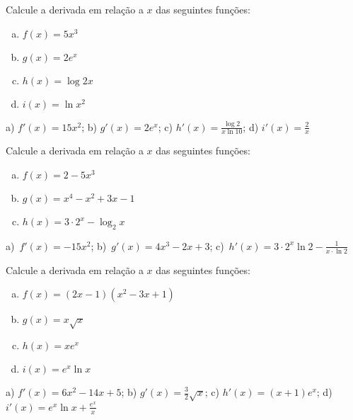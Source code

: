 \begin{exer}
  Calcule a derivada em relação a $x$ das seguintes funções:
  \begin{enumerate}[a)]
  \item $\displaystyle f(x) = 5x^3$
  \item $\displaystyle g(x) = 2e^x$
  \item $\displaystyle h(x) = \log 2x$
  \item $\displaystyle i(x) = \ln x^2$
  \end{enumerate}
\end{exer}
\begin{resp}
  a) $\displaystyle f'(x) = 15x^2$; b) $\displaystyle g'(x) = 2e^x$; c) $\displaystyle h'(x) = \frac{\log 2}{x\ln 10}$; d) $\displaystyle i'(x) = \frac{2}{x}$
\end{resp}

\begin{exer}
  Calcule a derivada em relação a $x$ das seguintes funções:
  \begin{enumerate}[a)]
  \item $\displaystyle f(x) = 2 - 5x^3$ \\
  \item $\displaystyle g(x) = x^4 - x^2 + 3x - 1$
  \item $\displaystyle h(x) = 3\cdot 2^x - \log_2 x$
  \end{enumerate}
\end{exer}
\begin{resp}
  a)~$\displaystyle f'(x) = -15x^2$; b)~$\displaystyle g'(x)= 4x^3 - 2x + 3$; c)~$\displaystyle h'(x) = 3\cdot 2^x\ln 2 - \frac{1}{x\cdot \ln 2}$
\end{resp}

\begin{exer}
  Calcule a derivada em relação a $x$ das seguintes funções:
  \begin{enumerate}[a)]
  \item $\displaystyle f(x) = (2x - 1)(x^2 - 3x + 1)$
  \item $\displaystyle g(x) = x\sqrt{x}$
  \item $\displaystyle h(x) = xe^x$
  \item $\displaystyle i(x) = e^x\ln x$
  \end{enumerate}
\end{exer}
\begin{resp}
  a) $\displaystyle f'(x) = 6x^2 - 14x + 5$; b) $\displaystyle g'(x) = \frac{3}{2}\sqrt{x}$; c) $\displaystyle h'(x) = (x+1)e^x$; d) $\displaystyle i'(x) = e^x\ln x + \frac{e^x}{x}$
\end{resp}

